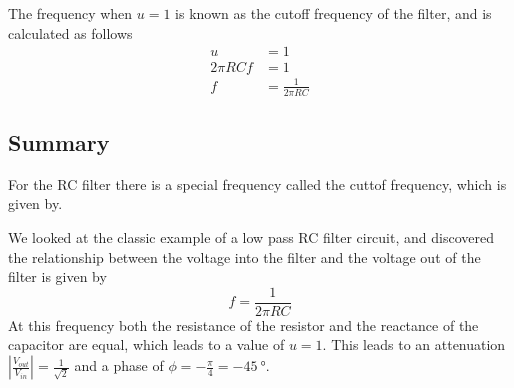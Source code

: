 The frequency when $u=1$ is known as the cutoff frequency of the filter, and
is calculated as follows
\begin{align}
  u &= 1 \nonumber \\
  2\pi R C f &= 1 \nonumber \\
  f &= \frac{1}{2\pi R C} \label{eq:RC_cuttof}
\end{align}

\begin{framed}
\subsection*{Summary}
For the RC filter there is a special frequency called the cuttof frequency, which
is given by.

We looked at the classic example of a low pass RC filter circuit, and discovered
the relationship between the voltage into the filter and the voltage out of the
filter is given by
\begin{equation*}
  f = \frac{1}{2\pi R C} \label{eq:RC_cuttof}
\end{equation*}
At this frequency both the resistance of the resistor and the reactance of the
capacitor are equal, which leads to a value of $u=1$.
This leads to an attenuation $\left|\frac{V_{out}}{V_{in}}\right| = \frac{1}{\sqrt{2}}$ and
a phase of $\phi=-\frac{\pi}{4}=-\SI{45}{\degree}$.
\end{framed}
